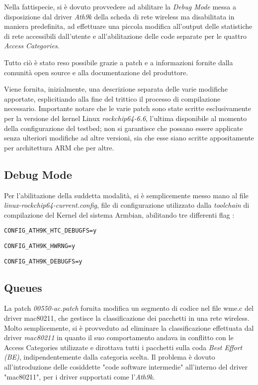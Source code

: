 Nella fattispecie, si è dovuto provvedere ad abilitare la \textit{Debug Mode} messa a disposizione dal driver \textit{Ath9k} della scheda di rete wireless ma disabilitata in maniera predefinita, ad effettuare una piccola modifica all'output delle statistiche di rete accessibili dall'utente e all'abilitazione delle code separate per le quattro \textit{Access Categories}.

Tutto ciò è stato reso possibile grazie a patch e a informazioni fornite dalla comunità open source e alla documentazione del produttore.

Viene fornita, inizialmente, una descrizione separata delle varie modifiche apportate, esplicitiando alla fine del trittico il processo di compilazione necessario. Importante notare che le varie patch sono state scritte esclusivamente per la versione del kernel Linux \textit{rockchip64-6.6}, l'ultima disponibile al momento della configurazione del testbed; non si garantisce che possano essere applicate senza ulteriori modifiche ad altre versioni, sia che esse siano scritte appositamente per architettura ARM che per altre.

\subsection[Debug Mode]{Debug Mode}
Per l'abilitazione della suddetta modalità, si è semplicemente messo mano al file \textit{linux-rockchip64-current.config}, file di configurazione utilizzato dalla \textit{toolchain} di compilazione del Kernel del sistema Armbian, abilitando tre differenti flag \cite{linux_wireless}:

\verb|CONFIG_ATH9K_HTC_DEBUGFS=y|

\verb|CONFIG_ATH9K_HWRNG=y|

\verb|CONFIG_ATH9K_DEBUGFS=y|

\subsection[Queues]{Queues}
La patch \textit{00550-ac.patch} fornita modifica un segmento di codice nel file wme.c del driver mac80211, che gestisce la classificazione dei pacchetti in una rete wireless.
Molto semplicemente, si è provveduto ad eliminare la classificazione effettuata dal driver \textit{mac80211} in quanto il suo comportamento andava in conflitto con le Access Categories utilizzate e dirottava tutti i pacchetti sulla coda \textit{Best Effort (BE)}, indipendentemente dalla categoria scelta.
Il problema è dovuto all'introduzione delle cosiddette "code software intermedie" all'interno del driver "mac80211", per i driver supportati \cite{intermediate_queue} come l'\textit{Ath9k}.


